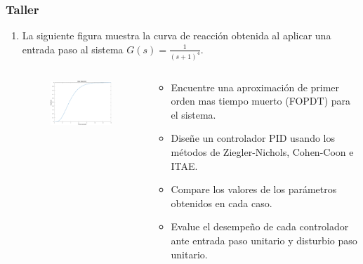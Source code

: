 \documentclass[aspectratio=169]{beamer}
\theoremstyle{definition}
\theoremstyle{plain}
\theoremstyle{remark}
\newcounter{saveenumi}
\newcommand{\seti}{\setcounter{saveenumi}{\value{enumi}}}
\newcommand{\conti}{\setcounter{enumi}{\value{saveenumi}}}
\begin{document}
\begin{frame}[c]\frametitle{Taller}
	\begin{enumerate}
		\conti
		\item La siguiente figura muestra la curva de reacción obtenida al aplicar una entrada paso al sistema $G(s) = \frac{1}{(s+1)^4}$.
		\vspace*{-5mm}
		\begin{columns}
		\begin{column}{0.5\textwidth}
		\begin{figure}
			\includegraphics[width=7cm]{images/responseCurve.eps}
		\end{figure}
		\end{column}	
		\begin{column}{0.5\textwidth}
		\begin{itemize}
			\item Encuentre una aproximación de primer orden mas tiempo muerto (FOPDT) para el sistema.
			\item Diseñe un controlador PID usando los métodos de Ziegler-Nichols, Cohen-Coon e ITAE.
			\item Compare los valores de los parámetros obtenidos en cada caso.
			\item Evalue el desempeño de cada controlador ante entrada paso unitario y disturbio paso unitario.
		\end{itemize}
		\end{column}	
		\end{columns}
		\seti
	\end{enumerate}
\end{frame}
\end{document}
